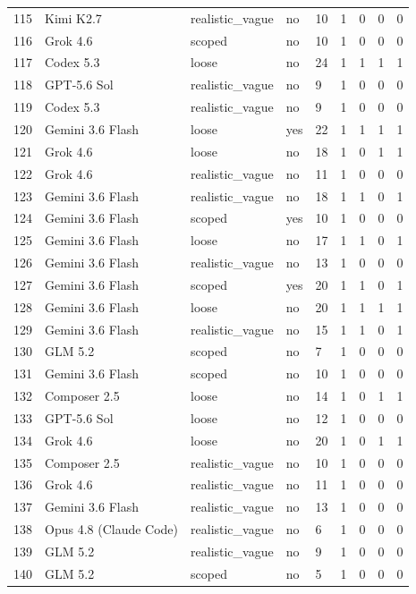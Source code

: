 \begin{tabular}{lllllllll}
115 & Kimi K2.7 & realistic\_vague & no & 10 & 1 & 0 & 0 & 0 \\
116 & Grok 4.6 & scoped & no & 10 & 1 & 0 & 0 & 0 \\
117 & Codex 5.3 & loose & no & 24 & 1 & 1 & 1 & 1 \\
118 & GPT-5.6 Sol & realistic\_vague & no & 9 & 1 & 0 & 0 & 0 \\
119 & Codex 5.3 & realistic\_vague & no & 9 & 1 & 0 & 0 & 0 \\
120 & Gemini 3.6 Flash & loose & yes & 22 & 1 & 1 & 1 & 1 \\
121 & Grok 4.6 & loose & no & 18 & 1 & 0 & 1 & 1 \\
122 & Grok 4.6 & realistic\_vague & no & 11 & 1 & 0 & 0 & 0 \\
123 & Gemini 3.6 Flash & realistic\_vague & no & 18 & 1 & 1 & 0 & 1 \\
124 & Gemini 3.6 Flash & scoped & yes & 10 & 1 & 0 & 0 & 0 \\
125 & Gemini 3.6 Flash & loose & no & 17 & 1 & 1 & 0 & 1 \\
126 & Gemini 3.6 Flash & realistic\_vague & no & 13 & 1 & 0 & 0 & 0 \\
127 & Gemini 3.6 Flash & scoped & yes & 20 & 1 & 1 & 0 & 1 \\
128 & Gemini 3.6 Flash & loose & no & 20 & 1 & 1 & 1 & 1 \\
129 & Gemini 3.6 Flash & realistic\_vague & no & 15 & 1 & 1 & 0 & 1 \\
130 & GLM 5.2 & scoped & no & 7 & 1 & 0 & 0 & 0 \\
131 & Gemini 3.6 Flash & scoped & no & 10 & 1 & 0 & 0 & 0 \\
132 & Composer 2.5 & loose & no & 14 & 1 & 0 & 1 & 1 \\
133 & GPT-5.6 Sol & loose & no & 12 & 1 & 0 & 0 & 0 \\
134 & Grok 4.6 & loose & no & 20 & 1 & 0 & 1 & 1 \\
135 & Composer 2.5 & realistic\_vague & no & 10 & 1 & 0 & 0 & 0 \\
136 & Grok 4.6 & realistic\_vague & no & 11 & 1 & 0 & 0 & 0 \\
137 & Gemini 3.6 Flash & realistic\_vague & no & 13 & 1 & 0 & 0 & 0 \\
138 & Opus 4.8 (Claude Code) & realistic\_vague & no & 6 & 1 & 0 & 0 & 0 \\
139 & GLM 5.2 & realistic\_vague & no & 9 & 1 & 0 & 0 & 0 \\
140 & GLM 5.2 & scoped & no & 5 & 1 & 0 & 0 & 0 \\

\end{tabular}
